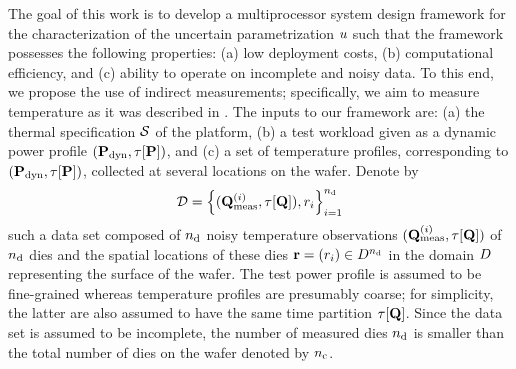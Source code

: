 The goal of this work is to develop a multiprocessor system design framework for the characterization of the uncertain parametrization $u$ such that the framework possesses the following properties: (a) low deployment costs, (b) computational efficiency, and (c) ability to operate on incomplete and noisy data.
To this end, we propose the use of indirect measurements; specifically, we aim to measure temperature as it was described in .
The inputs to our framework are: (a) the thermal specification $\mathcal{S}$ of the platform, (b) a test workload given as a dynamic power profile $(\mathbf{P}_{\text{dyn}}, \tau[\mathbf{P}])$, and (c) a set of temperature profiles, corresponding to $(\mathbf{P}_{\text{dyn}}, \tau[\mathbf{P}])$, collected at several locations on the wafer. Denote by
\[
  \mathcal{D} = \left\{ (\mathbf{Q}^{(i)}_{\text{meas}}, \tau[\mathbf{Q}]), r_i \right\}_{i = 1}^{n_{\text{d}}}
\]
such a data set composed of ${n_{\text{d}}}$ noisy temperature observations $(\mathbf{Q}^{(i)}_{\text{meas}}, \tau[\mathbf{Q}])$ of ${n_{\text{d}}}$ dies and the spatial locations of these dies $\mathbf{r} = (r_i) \in D^{n_{\text{d}}}$ in the domain $D$ representing the surface of the wafer.
The test power profile is assumed to be fine-grained whereas temperature profiles are presumably coarse; for simplicity, the latter are also assumed to have the same time partition $\tau[\mathbf{Q}]$.
Since the data set is assumed to be incomplete, the number of measured dies ${n_{\text{d}}}$ is smaller than the total number of dies on the wafer denoted by ${n_{\text{c}}}$.
